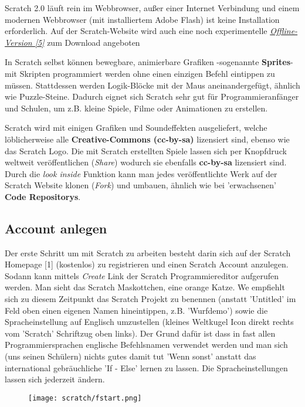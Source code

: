 \documentclass[10pt,a4paper,ngerman,twoside]{article} %
\begin{document}
Scratch 2.0 läuft rein im Webbrowser, außer einer Internet Verbindung und einem modernen Webbrowser (mit installiertem Adobe Flash) ist keine Installation erforderlich. Auf der Scratch-Website wird auch eine noch experimentelle \href{http://scratch.mit.edu/scratch2download/}{\textit{Offline-Version [5]}} zum Download angeboten

In Scratch selbst können bewegbare, animierbare Grafiken -sogenannte \textbf{Sprites}- mit Skripten programmiert werden ohne einen einzigen Befehl eintippen zu müssen. Stattdessen werden Logik-Blöcke mit der Maus aneinandergefügt, ähnlich wie Puzzle-Steine. Dadurch eignet sich Scratch sehr gut für Programmieranfänger und Schulen, um z.B. kleine Spiele, Filme oder Animationen zu erstellen. 

Scratch wird mit einigen Grafiken und Soundeffekten ausgeliefert, welche löblicherweise alle \textbf{Creative-Commons (cc-by-sa)} lizensiert sind, ebenso wie das Scratch Logo. Die mit Scratch erstellten Spiele lassen sich per Knopfdruck weltweit veröffentlichen (\textit{Share}) wodurch sie ebenfalls \textbf{cc-by-sa} lizensiert sind. Durch die \textit{look inside} Funktion kann man jedes veröffentlichte Werk auf der Scratch Website klonen (\textit{Fork}) und umbauen, ähnlich wie bei 'erwachsenen' \textbf{Code Repositorys}.


\subsection*{Account anlegen}

Der erste Schritt um mit Scratch zu arbeiten besteht darin sich auf der Scratch Homepage [1] (kostenlos) zu registrieren und einen Scratch Account anzulegen. Sodann kann mittels \textit{Create} Link der Scratch Programmiereditor aufgerufen werden. Man sieht das Scratch Maskottchen, eine orange Katze. We empfiehlt sich zu diesem Zeitpunkt das Scratch Projekt zu benennen (anstatt 'Untitled' im Feld oben einen eigenen Namen hineintippen, z.B. 'Wurfdemo') sowie die Spracheinstellung auf Englisch umzustellen (kleines Weltkugel Icon direkt rechts vom 'Scratch' Schriftzug oben links). Der Grund dafür ist dass in fast allen Programmiersprachen englische Befehlsnamen verwendet werden und man sich (uns seinen Schülern) nichts gutes damit tut 'Wenn sonst' anstatt das international gebräuchliche 'If - Else' lernen zu lassen. Die Spracheinstellungen lassen sich jederzeit ändern.

\begin{figure}
\texttt{[image: scratch/fstart.png]}
\end{figure}
\end{document}
